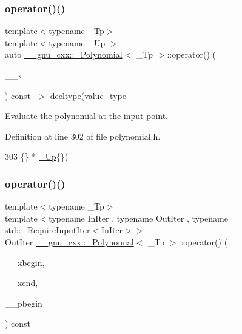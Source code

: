 \subsubsection{\texorpdfstring{operator()()}{operator()()}\hspace{0.1cm}{\footnotesize\ttfamily [3/4]}}
{\footnotesize\ttfamily template$<$typename \+\_\+\+Tp$>$ \\
template$<$typename \+\_\+\+Up $>$ \\
auto \hyperlink{class____gnu__cxx_1_1__Polynomial}{\+\_\+\+\_\+gnu\+\_\+cxx\+::\+\_\+\+Polynomial}$<$ \+\_\+\+Tp $>$\+::operator() (\begin{DoxyParamCaption}\item[{\hyperlink{class____gnu__cxx_1_1__Polynomial_a242114d4b86648a5dff67a8221f80d40}{\+\_\+\+Up}}]{\+\_\+\+\_\+x }\end{DoxyParamCaption}) const -\/$>$ decltype(\hyperlink{class____gnu__cxx_1_1__Polynomial_a725563351f50e76084a7a016c06f8a53}{value\+\_\+type}\hspace{0.3cm}{\ttfamily [inline]}}

Evaluate the polynomial at the input point. 

Definition at line 302 of file polynomial.\+h.


\begin{DoxyCode}
303                               \{\} * \hyperlink{class____gnu__cxx_1_1__Polynomial_a242114d4b86648a5dff67a8221f80d40}{\_Up}\{\})
\end{DoxyCode}
\mbox{\label{class____gnu__cxx_1_1__Polynomial_a06d7b0b57d6764da29049b3c2b6f890c}} 
\subsubsection{\texorpdfstring{operator()()}{operator()()}\hspace{0.1cm}{\footnotesize\ttfamily [4/4]}}
{\footnotesize\ttfamily template$<$typename \+\_\+\+Tp$>$ \\
template$<$typename In\+Iter , typename Out\+Iter , typename  = std\+::\+\_\+\+Require\+Input\+Iter$<$\+In\+Iter$>$$>$ \\
Out\+Iter \hyperlink{class____gnu__cxx_1_1__Polynomial}{\+\_\+\+\_\+gnu\+\_\+cxx\+::\+\_\+\+Polynomial}$<$ \+\_\+\+Tp $>$\+::operator() (\begin{DoxyParamCaption}\item[{const In\+Iter \&}]{\+\_\+\+\_\+xbegin,  }\item[{const In\+Iter \&}]{\+\_\+\+\_\+xend,  }\item[{Out\+Iter \&}]{\+\_\+\+\_\+pbegin }\end{DoxyParamCaption}) const\hspace{0.3cm}{\ttfamily [inline]}}

